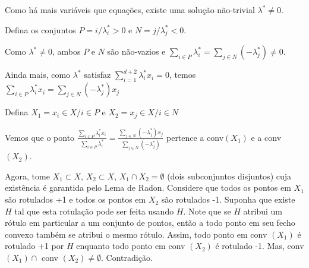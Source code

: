 Como há mais variáveis que equações, existe uma solução não-trivial $\lambda^* \neq 0$.

Defina os conjuntos $P = {i / \lambda^*_i > 0}$ e $N = {j / \lambda^*_j < 0}$.

Como $\lambda^* \neq 0$, ambos $P$ e $N$ são não-vazios e $\sum_{i \in P} \lambda^*_i = \sum_{j \in N} (- \lambda^*_j) \neq 0$.


Ainda mais, como $\lambda^*$ satisfaz $\sum_{i=1}^{d+2} \lambda^*_i x_i = 0$, temos
$\sum_{i \in P} \lambda^*_i x_i = \sum_{j \in N} (- \lambda^*_j) x_j$

Defina $X_1 = {x_i \in X / i \in P}$ e $X_2 = {x_j \in X / i \in N}$

Vemos que o ponto $\frac{\displaystyle\sum_{i \in P} \lambda^*_i x_i }{\displaystyle\sum_{i \in P} \lambda^*_i} = \frac{\displaystyle\sum_{j \in N} (- \lambda^*_j) x_j}{\displaystyle\sum_{j \in N} (- \lambda^*_j)}$ pertence a conv$(X_1)$ e a conv$(X_2)$.


Agora, tome $X_1 \subset X$, $X_2 \subset X$, $X_1 \cap X_2 = \emptyset$ (dois subconjuntos disjuntos) cuja existência é garantida pelo Lema de Radon.
Considere que todos os pontos em $X_1$ são rotulados +1 e todos os pontos em $X_2$ são rotulados -1.
Suponha que existe $H$ tal que esta rotulação pode ser feita usando $H$.
Note que se $H$ atribui um rótulo em particular a um conjunto de pontos, então a todo ponto em seu fecho convexo também se atribui o mesmo rótulo.
Assim, todo ponto em conv $(X_1)$ é rotulado +1 por $H$ enquanto todo ponto em conv $(X_2)$ é rotulado -1.
Mas, conv $(X_1) \cap$ conv $(X_2) \neq \emptyset$. Contradição.

\cqd
